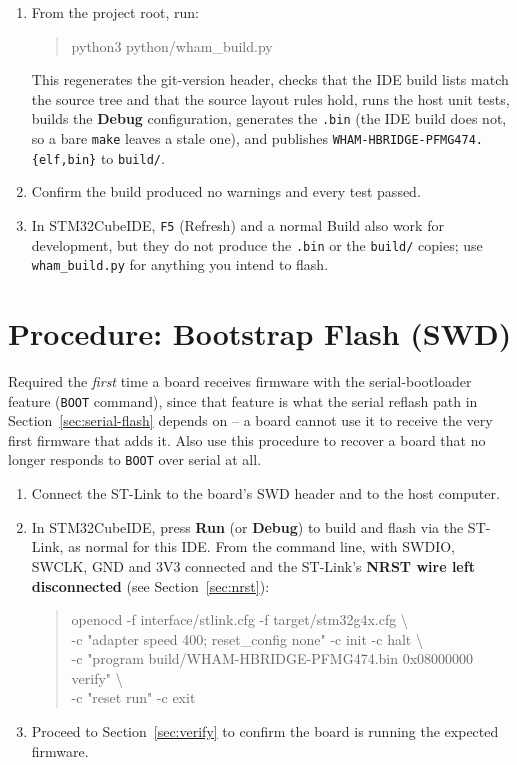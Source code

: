 \documentclass[11pt]{article}
\newcommand{\code}[1]{\texttt{#1}}
\begin{document}
\begin{enumerate}[label=\arabic*.]
  \item From the project root, run:
\begin{quote}\ttfamily\small\raggedright
python3 python/wham\_build.py
\end{quote}
    This regenerates the git-version header, checks that the IDE build
    lists match the source tree and that the source layout rules hold, runs
    the host unit tests, builds the \textbf{Debug} configuration, generates
    the \code{.bin} (the IDE build does not, so a bare \code{make} leaves a
    stale one), and publishes \code{WHAM-HBRIDGE-PFMG474.\{elf,bin\}} to
    \code{build/}.
  \item Confirm the build produced no warnings and every test passed.
  \item In STM32CubeIDE, \code{F5} (Refresh) and a normal Build also work
    for development, but they do not produce the \code{.bin} or the
    \code{build/} copies; use \code{wham\_build.py} for anything you intend
    to flash.
\end{enumerate}

\section{Procedure: Bootstrap Flash (SWD)}
\label{sec:bootstrap}

Required the \emph{first} time a board receives firmware with the
serial-bootloader feature (\code{BOOT} command), since that feature is
what the serial reflash path in Section~\ref{sec:serial-flash} depends
on -- a board cannot use it to receive the very first firmware that adds
it. Also use this procedure to recover a board that no longer responds
to \code{BOOT} over serial at all.

\begin{enumerate}[label=\arabic*.]
  \item Connect the ST-Link to the board's SWD header and to the host
    computer.
  \item In STM32CubeIDE, press \textbf{Run} (or \textbf{Debug}) to build
    and flash via the ST-Link, as normal for this IDE. From the command
    line, with SWDIO, SWCLK, GND and 3V3 connected and the ST-Link's
    \textbf{NRST wire left disconnected} (see Section~\ref{sec:nrst}):
\begin{quote}\ttfamily\small\raggedright
openocd -f interface/stlink.cfg -f target/stm32g4x.cfg \textbackslash\\
\hspace*{1em}-c "adapter speed 400; reset\_config none" -c init -c halt
\textbackslash\\
\hspace*{1em}-c "program build/WHAM-HBRIDGE-PFMG474.bin 0x08000000 verify"
\textbackslash\\
\hspace*{1em}-c "reset run" -c exit
\end{quote}
  \item Proceed to Section~\ref{sec:verify} to confirm the board is
    running the expected firmware.
\end{enumerate}
\end{document}
